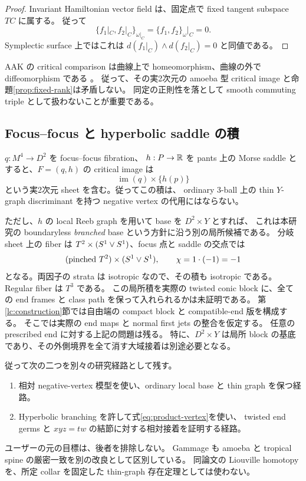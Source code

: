 \begin{proof}
Invariant Hamiltonian vector field は、固定点で fixed tangent subspace $TC$ に属する。
従って
\[
\{f_1|_C,f_2|_C\}_{\omega|_C}
=\{f_1,f_2\}_{\omega}|_C=0.
\]
Symplectic surface 上ではこれは
$d(f_1|_C)\wedge d(f_2|_C)=0$ と同値である。
\end{proof}

AAK の critical comparison は曲線上で homeomorphism、曲線の外で diffeomorphism である
\cite[Lemma 4.1, Appendix B]{aak}。
従って、その実2次元の amoeba 型 critical image と命題\ref{prop:fixed-rank}は矛盾しない。
同定の正則性を落として smooth commuting triple として扱わないことが重要である。

\subsection{Focus--focus と hyperbolic saddle の積}

$q:M^4\to D^2$ を focus--focus fibration、
$h:P\to\mathbb R$ を pants 上の Morse saddle とすると、$F=(q,h)$ の critical image は
\[
\operatorname{im}(q)\times\{h(p)\}
\]
という実2次元 sheet を含む。従ってこの積は、
ordinary 3-ball 上の thin $Y$-graph discriminant を持つ negative vertex の代用にはならない。

ただし、$h$ の local Reeb graph を用いて base を $D^2\times Y$ とすれば、
これは本研究の boundaryless \emph{branched} base という方針に沿う別の局所候補である。
分岐 sheet 上の fiber は $T^2\times(S^1\vee S^1)$、focus 点と saddle の交点では
\begin{equation}\label{eq:product-vertex}
(\text{pinched }T^2)\times(S^1\vee S^1),\qquad
\chi=1\cdot(-1)=-1
\end{equation}
となる。両因子の strata は isotropic なので、その積も isotropic である。
Regular fiber は $T^3$ である。
この局所積を実際の twisted conic block に、全ての end frames と class path を保って入れられるかは未証明である。
第\ref{lc:construction}節では自由端の compact block と compatible-end 版を構成する。
そこでは実際の end maps と normal first jets の整合を仮定する。
任意の prescribed end に対する上記の問題は残る。
特に、$D^2\times Y$ は局所 block の基底であり、その外側境界を全て消す大域接着は別途必要となる。

従って次の二つを別々の研究経路として残す。
\begin{enumerate}
\item 相対 negative-vertex 模型を使い、ordinary local base と thin graph を保つ経路。
\item Hyperbolic branching を許して式\eqref{eq:product-vertex}を使い、
twisted end germs と $xyz=tw$ の結節に対する相対接着を証明する経路。
\end{enumerate}
ユーザーの元の目標は、後者を排除しない。
Gammage \cite[Remark 3.10]{gammage} も amoeba と tropical spine の厳密一致を別の改良として区別している。
同論文の Liouville homotopy を、所定 collar を固定した thin-graph 存在定理としては使わない。

